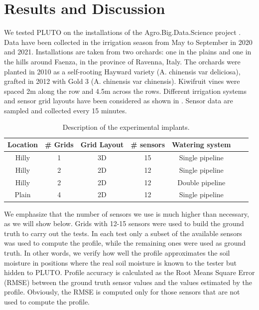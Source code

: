\section{Results and Discussion}
\label{pluto-sec:ResultsAndDiscussion}
We tested PLUTO on the installations of the Agro.Big.Data.Science project \cite{ABDS}.
Data have been collected in the irrigation season from May to September in 2020 and 2021.
Installations are taken from two orchards: one in the plains and one in the hills around Faenza, in the province of Ravenna, Italy.
The orchards were planted in 2010 as a self-rooting Hayward variety (A. chinensis var deliciosa), grafted in 2012 with Gold 3 (A. chinensis var chinensis). 
Kiwifruit vines were spaced 2m along the row and 4.5m across the rows.
Different irrigation systems and sensor grid layouts have been considered as shown in .
Sensor data are sampled and collected every 15 minutes. 
\begin{table}[t]
\centering
\begin{tabular}{@{}ccccccc@{}}
\toprule
Location & \# Grids & Grid Layout & \# sensors & Watering system \\ \midrule
Hilly & 1 & 3D & 15 & Single pipeline \\
Hilly & 2 & 2D & 12 & Single pipeline \\
Hilly & 2 & 2D & 12 & Double pipeline \\
Plain & 4 & 2D & 12 & Single pipeline \\ \bottomrule
\end{tabular}
\caption{Description of the experimental implants.}\label{pluto-tbl:implants}
\end{table}

We emphasize that the number of sensors we use is much higher than necessary, as we will show below. 
Grids with 12-15 sensors were used to build the ground truth to carry out the tests. In each test only a subset of the available sensors was used to compute the profile, while the remaining ones were used as ground truth. In other words, we verify how well the profile approximates the soil moisture in positions where the real soil moisture is known to the tester but hidden to PLUTO. Profile accuracy is calculated as the Root Means Square Error (RMSE) between the ground truth sensor values and the values estimated by the profile. Obviously, the RMSE is computed only for those sensors that are not used to compute the profile.

